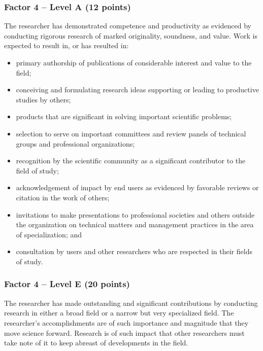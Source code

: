 \subsubsection*{Factor 4 -- Level A (12 points)}

The researcher has demonstrated competence and productivity as evidenced by conducting rigorous research of marked originality, soundness, and value.
Work is expected to result in, or has resulted in: 

\begin{itemize}
  \item primary authorship of publications of considerable interest and value to the field;
  \item conceiving and formulating research ideas supporting or leading to productive studies by others;
  \item products that are significant in solving important scientific problems;
  \item  selection to serve on important committees and review panels of technical groups and professional organizations;
  \item  recognition by the scientific community as a significant contributor to the field of study;
  \item acknowledgement of impact by end users as evidenced by favorable reviews or citation in the work of others;
  \item invitations to make presentations to professional societies and others outside the organization on technical matters and management practices in the area of specialization; and
  \item consultation by users and other researchers who are respected in their fields of study.
\end{itemize}

\subsubsection*{Factor 4 -- Level E (20 points)}

The researcher has made outstanding and significant contributions by conducting research in 
either a broad field or a narrow but very specialized field.
The researcher's accomplishments are of such importance and magnitude
that they move science forward.
Research is of such impact that other researchers must take note of it
to keep abreast of developments in the field. \\


